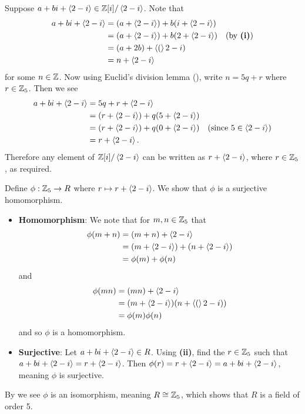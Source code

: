 \begin{questions}
\begin{partquestions}{\roman*}
        \item Suppose $a + bi + \left\langle2-i\right\rangle \in \mathbb{Z}[i]/\left\langle2-i\right\rangle$. Note that
        \begin{align*}
            a + bi + \left\langle2-i\right\rangle &= (a+\left\langle2-i\right\rangle) + b(i + \left\langle2-i\right\rangle)\\
            &= (a+\left\langle2-i\right\rangle) + b(2 + \left\langle2-i\right\rangle) & (\text{by }\textbf{(i)})\\
            &= (a + 2b) + \left\langle(\right\rangle2-i)\\
            &= n + \left\langle2-i\right\rangle
        \end{align*}
        for some $n \in \mathbb{Z}$. Now using Euclid's division lemma (), write $n = 5q + r$ where $r \in \mathbb{Z}_5$. Then we see
        \begin{align*}
            a + bi + \left\langle2-i\right\rangle &= 5q + r + \left\langle2-i\right\rangle\\
            &= (r + \left\langle2-i\right\rangle) + q(5 + \left\langle2-i\right\rangle)\\
            &= (r + \left\langle2-i\right\rangle) + q(0 + \left\langle2-i\right\rangle) & (\text{since } 5 \in \left\langle2-i\right\rangle)\\
            &= r + \left\langle2-i\right\rangle.
        \end{align*}
        Therefore any element of $\mathbb{Z}[i]/\left\langle2-i\right\rangle$ can be written as $r + \left\langle2-i\right\rangle$, where $r \in \mathbb{Z}_5$, as required.

        \item Define $\phi: \mathbb{Z}_5 \to R$ where $r \mapsto r + \left\langle2-i\right\rangle$. We show that $\phi$ is a surjective homomorphism.
        \begin{itemize}
            \item \textbf{Homomorphism}: We note that for $m,n \in \mathbb{Z}_5$ that
            \begin{align*}
                \phi(m+n) &= (m+n) + \left\langle2-i\right\rangle\\
                &= (m + \left\langle2-i\right\rangle) + (n + \left\langle2-i\right\rangle)\\
                &= \phi(m) + \phi(n)
            \end{align*}
            and
            \begin{align*}
                \phi(mn) &= (mn) + \left\langle2-i\right\rangle\\
                &= (m + \left\langle2-i\right\rangle)(n + \left\langle(\right\rangle2-i))\\
                &= \phi(m)\phi(n)
            \end{align*}
            and so $\phi$ is a homomorphism.

            \item \textbf{Surjective}: Let $a+bi + \left\langle2-i\right\rangle \in R$. Using \textbf{(ii)}, find the $r \in \mathbb{Z}_5$ such that $a+bi + \left\langle2-i\right\rangle = r + \left\langle2-i\right\rangle$. Then $\phi(r) = r + \left\langle2-i\right\rangle = a+bi + \left\langle2-i\right\rangle$, meaning $\phi$ is surjective.
        \end{itemize}
        By  we see $\phi$ is an isomorphism, meaning $R \cong \mathbb{Z}_5$, which shows that $R$ is a field of order 5.
    \end{partquestions}


\end{questions}

